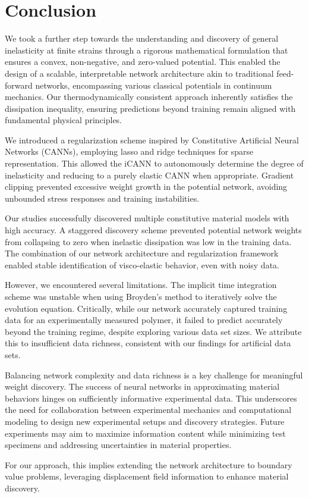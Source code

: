 \section{Conclusion}
\label{sec:conclusion}
%
We took a further step towards the understanding and discovery of general inelasticity at finite strains through a rigorous mathematical formulation that ensures a convex, non-negative, and zero-valued potential. 
This enabled the design of a scalable, interpretable network architecture akin to traditional feed-forward networks, encompassing various classical potentials in continuum mechanics. 
Our thermodynamically consistent approach inherently satisfies the dissipation inequality, ensuring predictions beyond training remain aligned with fundamental physical principles.

We introduced a regularization scheme inspired by Constitutive Artificial Neural Networks (CANNs), employing lasso and ridge techniques for sparse representation. 
This allowed the iCANN to autonomously determine the degree of inelasticity and reducing to a purely elastic CANN when appropriate. 
Gradient clipping prevented excessive weight growth in the potential network, avoiding unbounded stress responses and training instabilities.

Our studies successfully discovered multiple constitutive material models with high accuracy. 
A staggered discovery scheme prevented potential network weights from collapsing to zero when inelastic dissipation was low in the training data. 
The combination of our network architecture and regularization framework enabled stable identification of visco-elastic behavior, even with noisy data.

However, we encountered several limitations. 
The implicit time integration scheme was unstable when using Broyden's method to iteratively solve the evolution equation. 
Critically, while our network accurately captured training data for an experimentally measured polymer, it failed to predict accurately beyond the training regime, despite exploring various data set sizes. 
We attribute this to insufficient data richness, consistent with our findings for artificial data sets.

Balancing network complexity and data richness is a key challenge for meaningful weight discovery. 
The success of neural networks in approximating material behaviors hinges on sufficiently informative experimental data. 
This underscores the need for collaboration between experimental mechanics and computational modeling to design new experimental setups and discovery strategies. 
Future experiments may aim to maximize information content while minimizing test specimens and addressing uncertainties in material properties.

For our approach, this implies extending the network architecture to boundary value problems, leveraging displacement field information to enhance material discovery.